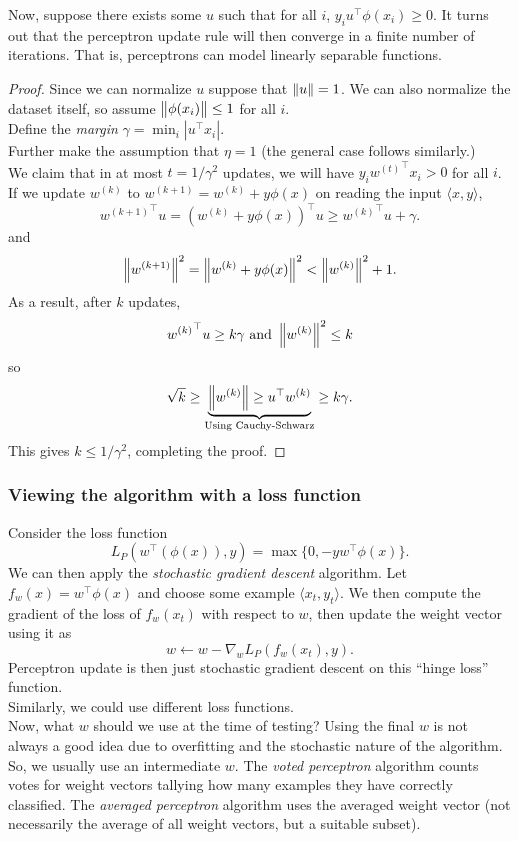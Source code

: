 \documentclass{article}
\begin{document}
			Now, suppose there exists some $u$ such that for all $i$, $y_i u^\top \phi(x_i) \ge 0$. It turns out that the perceptron update rule will then converge in a finite number of iterations. That is, perceptrons can model linearly separable functions.
			\begin{proof}
				Since we can normalize $u$ suppose that $\left\lVert u\right\rVert = 1$. We can also normalize the dataset itself, so assume $\left\lVert\phi(x_i)\right\rVert \le 1$ for all $i$. \\
				Define the \emph{margin} $\gamma = \min_i |u^\top x_i|$.\\
				Further make the assumption that $\eta = 1$ (the general case follows similarly.) \\
				We claim that in at most $t = 1/\gamma^2$ updates, we will have $y_i {w^{(t)}}^\top x_i > 0$ for all $i$.\\
				If we update $w^{(k)}$ to $w^{(k+1)} = w^{(k)} + y\phi(x)$ on reading the input $\langle x,y\rangle$,
				\[ {w^{(k+1)}}^\top u =  (w^{(k)}+y\phi(x))^\top u \ge {w^{(k)}}^\top u + \gamma. \]
				and
				\[ \left\lVert w^{(k+1)}\right\rVert^2 = \left\lVert w^{(k)} + y\phi(x)\right\rVert^2 < \left\lVert w^{(k)}\right\rVert^2 + 1. \]
				As a result, after $k$ updates,
				\[ {w^{(k)}}^\top u \ge k\gamma \text{ and } \left\lVert w^{(k)}\right\rVert^2 \le k \]
				so
				\[ \sqrt{k} \ge \underbrace{\left\lVert w^{(k)}\right\rVert \ge u^\top w^{(k)}}_{\text{Using Cauchy-Schwarz}} \ge k\gamma. \]
				This gives $k \le 1/\gamma^2$, completing the proof.
			\end{proof}

		\subsubsection{Viewing the algorithm with a loss function}

			Consider the loss function
			\[ L_P(w^\top(\phi(x)),y) = \max\{ 0 , -yw^\top\phi(x) \}. \]
			We can then apply the \emph{stochastic gradient descent} algorithm. Let $f_w(x) = w^\top\phi(x)$ and choose some example $\langle x_t,y_t\rangle$. We then compute the gradient of the loss of $f_w(x_t)$ with respect to $w$, then update the weight vector using it as
			\[ w \gets w - \nabla_w L_P(f_w(x_t),y). \]
			Perceptron update is then just stochastic gradient descent on this ``hinge loss'' function.\\
			Similarly, we could use different loss functions.\\

			Now, what $w$ should we use at the time of testing? Using the final $w$ is not always a good idea due to overfitting and the stochastic nature of the algorithm.\\
			So, we usually use an intermediate $w$. The \emph{voted perceptron} algorithm counts votes for weight vectors tallying how many examples they have correctly classified. The \emph{averaged perceptron} algorithm uses the averaged weight vector (not necessarily the average of all weight vectors, but a suitable subset).\\
\end{document}
